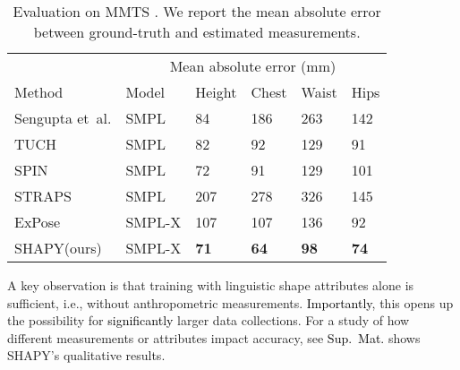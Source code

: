 \documentclass[10pt,twocolumn,letterpaper]{article}
\newcommand{\modelCOLOR}{black}
\newcommand{\modelname}{{\color{\modelCOLOR}SHAPY}\xspace}
\newcommand{\expose}{\mbox{ExPose}\xspace}
\newcommand{\straps}{\mbox{STRAPS}\xspace}
\newcommand{\tuch}{\mbox{TUCH}\xspace}
\newcommand{\mmts}{MMTS\xspace}
\newcommand{\vspaceTABaboveCaption}{-0.0 em}
\newcommand{\spin}{\mbox{SPIN}\xspace}
\newcommand{\smplx}{\mbox{SMPL-X}\xspace}
\newcommand{\groundtruth}{\mbox{ground-truth}\xspace}
\newcommand{\smpl}{\mbox{SMPL}\xspace}
\newcommand{\supmat}{{\mbox{\textcolor{black}{Sup.~Mat.}}}\xspace}
\renewcommand{\etal}{\mbox{et al.}\xspace}
\renewcommand{\ie}{\mbox{i.e.}\xspace}
\newcommand{\cameraready}[1]{\textcolor{Fuchsia}{{#1}}\xspace}
\renewcommand{\cameraready}[1]{\textcolor{black}{{#1}}\xspace}
\newcommand{\myarraystretch}[0]{1.1}
\newcommand{\colorTERM}{blue}
\renewcommand{\colorTERM}{black}
\newcommand{\measurements}[0]{{\color{\colorTERM}anthropometric measurements}\xspace}
\newcommand{\linguisticshapeattributes}[0]{{\color{\colorTERM}linguistic shape attributes}\xspace}
\begin{document}
 \begin{table}
\renewcommand{\arraystretch}{\myarraystretch} 
    \centering
    \scriptsize
    \begin{tabular}{llllll}
        \toprule
        & \multicolumn{5}{c}{Mean absolute error (mm) }                                           \\
        Method                              & Model     & Height    & Chest     & Waist     & Hips          \\ 
        \midrule  Sengupta \etal \cite{sengupta2021hierarchicalICCV} & \smpl  & 84       & 186       & 263       & 142  \\
        \tuch \cite{mueller2021tuch}        & \smpl  &    82      &  92       &  129      &  91        \\
        \spin   \cite{Kolotouros2019_spin}  & \smpl     &  72    & 91     & 129      & 101      \\
        \straps \cite{sengupta2020straps}   & \smpl      &  207       &   278  &    326   &   145  \\ 
        \expose \cite{Choutas2020_expose}   & \smplx    & 107       & 107       & 136       & 92            \\
        \modelname (ours)                   & \smplx  & \textbf{71} & \textbf{64} & \textbf{98}  & \textbf{74}     \\
        \bottomrule
    \end{tabular}
    \vspace{\vspaceTABaboveCaption}
    \caption{
        Evaluation on \mmts
        .
        We report the mean absolute error between \groundtruth and estimated measurements.
    }
    \label{tab:measurements_test}
\end{table}
 

A key observation 
is that training with \linguisticshapeattributes alone is sufficient, \ie, without \measurements.
\cameraready{Importantly}, this opens up the possibility for \cameraready{significantly} larger data collections. For a study of how different measurements or attributes impact accuracy, see \supmat
{} shows \modelname's qualitative results.


  
\vfill
\end{document}
